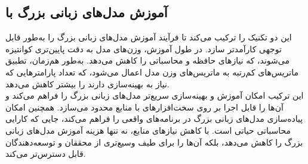 \subsection{آموزش مدل‌های زبانی بزرگ با }

 این دو تکنیک را ترکیب می‌کند تا فرآیند آموزش مدل‌های زبانی بزرگ را به‌طور قابل توجهی کارآمدتر سازد. در طول آموزش، وزن‌های مدل به دقت پایین‌تری کوانتیزه می‌شوند، که نیازهای حافظه و محاسباتی را کاهش می‌دهد. به‌طور هم‌زمان، تطبیق ماتریس‌های کم‌رتبه به ماتریس‌های وزن مدل اعمال می‌شود، که تعداد پارامترهایی که نیاز به بهینه‌سازی دارند را بیشتر کاهش می‌دهد.
\\
این ترکیب امکان آموزش و بهینه‌سازی سریع‌تر مدل‌های زبانی بزرگ را فراهم می‌کند و آن‌ها را قابل اجرا بر روی سخت‌افزارهای با منابع محدود می‌سازد.  همچنین امکان پیاده‌سازی مدل‌های زبانی بزرگ در برنامه‌های واقعی را فراهم می‌کند، جایی که کارایی محاسباتی حیاتی است. با کاهش نیازهای منابع،  نه تنها هزینه آموزش مدل‌های زبانی بزرگ را کاهش می‌دهد، بلکه آن‌ها را برای طیف وسیع‌تری از محققان و توسعه‌دهندگان قابل دسترس‌تر می‌کند.\cite{dettmers2023qlora}

\clearpage